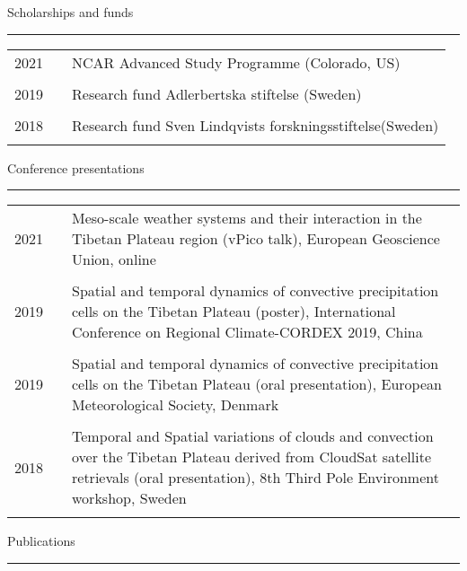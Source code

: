 \documentclass[a4paper,12pt]{article}
\begin{document}
\begin{titlepage}
\flushleft\large Scholarships and funds
\\[-1ex]
\rule{1\textwidth}{0.7pt}
\begin{table}[h!]
  \begin{tabular}{p{3.7cm}p{0.5cm}|p{12.5cm}}
 2021 && NCAR Advanced Study Programme (Colorado, US)\\
 &&\\
 2019 && Research fund Adlerbertska stiftelse (Sweden) \\
 &&\\
 2018 && Research fund Sven Lindqvists forskningsstiftelse(Sweden)\\
& \\[-1.7ex]
	\end{tabular}
\end{table}


\flushleft\large Conference presentations
\\[-1ex]
\rule{1\textwidth}{0.7pt}
\begin{table}[h!]
  \begin{tabular}{p{3.7cm}p{0.5cm}|p{12.5cm}}
 2021 && Meso-scale weather systems and their interaction in the Tibetan Plateau region (vPico talk), European Geoscience Union, online\\
 &&\\
 2019 && Spatial and temporal dynamics of convective precipitation cells on the Tibetan Plateau (poster), International Conference on Regional
Climate-CORDEX 2019, China \\
&&\\
 2019 && Spatial and temporal dynamics of convective precipitation cells on the Tibetan Plateau (oral presentation), European Meteorological Society, Denmark \\
 &&\\
 2018 && Temporal and Spatial variations of clouds and convection over the Tibetan Plateau derived from CloudSat satellite retrievals (oral presentation), 8th Third Pole Environment workshop, Sweden\\
& \\[-1.7ex]
	\end{tabular}
\end{table}


\newpage


\flushtop
\flushleft\large Publications
\\[-1ex]
\rule{1\textwidth}{0.7pt}
\begin{table}[h!]


\end{table}
\end{titlepage}
\end{document}
